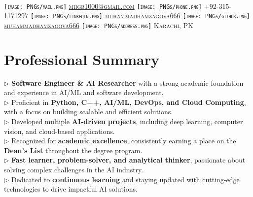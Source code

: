 \documentclass[]{resume-openfont}
\begin{document}
\newcommand{\yourName}{Muhammad Hamza}
\newcommand{\yourAddress}{Karachi, PK}
\newcommand{\yourEmail}{mhgb1000@gmail.com}
\newcommand{\yourPhone}{+92-315-1171297}
\newcommand{\githubUserName}{muhammadhamzagova666}
\newcommand{\linkedInUserName}{muhammadhamzagova666}

\begin{center}
    \Huge \scshape \latoRegular{\yourName} \\ \vspace{1pt}
    \small \texttt{[image: PNGs/mail.png]} \href{mailto:\yourEmail}{\yourEmail} \textbullet{} \texttt{[image: PNGs/phone.png]} \yourPhone \textbullet{} \texttt{[image: PNGs/linkedin.png]} \href{https://www.linkedin.com/in/\linkedInUserName}{\linkedInUserName} \textbullet{} \texttt{[image: PNGs/github.png]} \href{https://github.com/\githubUserName}{\githubUserName} \textbullet{} \texttt{[image: PNGs/address.png]} \yourAddress
\end{center}

\section{Professional Summary}
$\triangleright$ \textbf{Software Engineer \& AI Researcher} with a strong academic foundation and experience in AI/ML and software development.\\
$\triangleright$ Proficient in \textbf{Python, C++, AI/ML, DevOps, and Cloud Computing}, with a focus on building scalable and efficient solutions.\\
$\triangleright$ Developed multiple \textbf{AI-driven projects}, including deep learning, computer vision, and cloud-based applications.\\
$\triangleright$ Recognized for \textbf{academic excellence}, consistently earning a place on the \textbf{Dean’s List} throughout the degree program.\\
$\triangleright$ \textbf{Fast learner, problem-solver, and analytical thinker}, passionate about solving complex challenges in the AI industry.\\
$\triangleright$ Dedicated to \textbf{continuous learning} and staying updated with cutting-edge technologies to drive impactful AI solutions.\\
\end{document}
